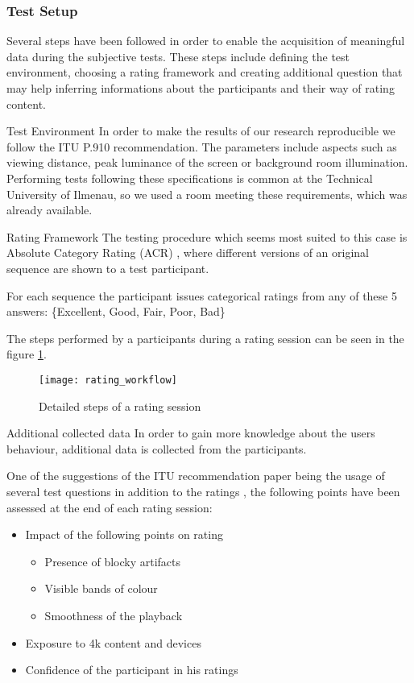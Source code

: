 
\begin{frame}
	\frametitle{Test Setup}
Several steps have been followed in order to enable the acquisition of meaningful data during the subjective tests. These steps include defining the test environment, choosing a rating framework and creating additional question that may help inferring informations about the participants and their way of rating content.


\large{Test Environment}
In order to make the results of our research reproducible we follow the ITU P.910 \cite{rec1998p} recommendation. 
The parameters include aspects such as viewing distance, peak luminance of the screen or background room illumination.
Performing tests following these specifications is common at the Technical University of Ilmenau, so we used a room meeting these requirements, which was already available.


	
\large{Rating Framework}
The testing procedure which seems most suited to this case is Absolute Category Rating (ACR) \cite{rec1998p}, where different versions of an original sequence are shown to a test participant. 

For each sequence the participant issues categorical ratings from any of these 5 answers: \{Excellent, Good, Fair, Poor, Bad\}

The steps performed by a participants during a rating session can be seen in the figure \ref{fig:workflow:state_machine}.

\begin{figure}[htb!]
	\centering
	\texttt{[image: rating\_workflow]}
	\caption{Detailed steps of a rating session}
	\label{fig:workflow:state_machine}
\end{figure}


\large{Additional collected data}
In order to gain more knowledge about the users behaviour, additional data is collected from the participants.

One of the suggestions of the ITU recommendation paper being the usage of several test questions in addition to the ratings \cite{rec1998p}, the following points have been assessed at the end of each rating session:
\begin{itemize}
	\item Impact of the following points on rating 
	\begin{itemize}
		\item Presence of blocky artifacts
		\item Visible bands of colour
		\item Smoothness of the playback
	\end{itemize}
	\item Exposure to 4k content and devices
	\item Confidence of the participant in his ratings
\end{itemize}


\end{frame}
